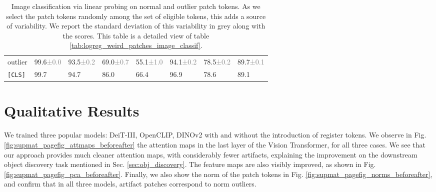 \documentclass{article} \usepackage{iclr2024_conference,times}
\begin{document}
\begin{table}[h]
\begin{tabular}{llllllll}
    outlier &  99.6\textcolor{gray}{\tiny{±0.0}} &  93.5\textcolor{gray}{\tiny{±0.2}} &  69.0\textcolor{gray}{\tiny{±0.7}} &  55.1\textcolor{gray}{\tiny{±1.0}} &  94.1\textcolor{gray}{\tiny{±0.2}} &  78.5\textcolor{gray}{\tiny{±0.2}} &  89.7\textcolor{gray}{\tiny{±0.1}} \\
    \texttt{[CLS]} &                               99.7 &                               94.7 &                               86.0 &                               66.4 &                               96.9 &                               78.6 &                               89.1 \\
    \bottomrule
    \end{tabular}
    \caption{Image classification via linear probing on normal and outlier patch tokens. As we select the patch tokens randomly among the set of eligible tokens, this adds a source of variability. We report the standard deviation of this variability in grey along with the scores. This table is a detailed view of table \ref{tab:logreg_weird_patches_image_classif}.}
    \label{tab:logreg_weird_patches_image_classif_with_std}
\end{table}


\section{Qualitative Results}
\label{sec:appendix_qualitative}
We trained three popular models: DeiT-III, OpenCLIP, DINOv2 with and without the introduction of register tokens.
We observe in Fig. \ref{fig:supmat_pagefig_attmaps_beforeafter} the attention maps in the last layer of the Vision Transformer, for all three cases.
We see that our approach provides much cleaner attention maps, with considerably fewer artifacts, explaining the improvement on the downstream object discovery task mentioned in Sec. \ref{sec:obj_discovery}.
The feature maps are also visibly improved, as shown in Fig. \ref{fig:supmat_pagefig_pca_beforeafter}.
Finally, we also show the norm of the patch tokens in Fig. \ref{fig:supmat_pagefig_norms_beforeafter}, and confirm that in all three models, artifact patches correspond to norm outliers.


\newpage
\end{document}
